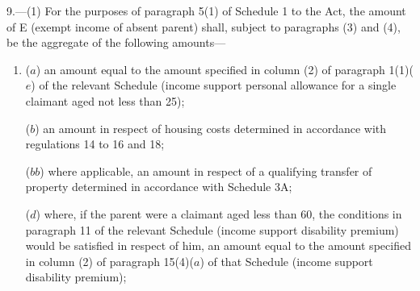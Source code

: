 \documentclass[12pt,a4paper]{article}
\begin{document}
9.—(1) For the purposes of paragraph 5(1) of Schedule 1 to the Act, the amount of E (exempt income of absent parent) shall, subject to paragraphs (3) and (4), be the aggregate of the following amounts—
\begin{enumerate}\item[]
($a$) an amount equal to the amount specified in column (2) of paragraph 1(1)($e$) of the relevant Schedule (income support personal allowance for a single claimant aged not less than 25);

($b$) an amount in respect of housing costs determined in accordance with regulations 14 to 
16 and 18;  %

($bb$) where applicable, an amount in respect of a qualifying transfer of property determined in accordance with Schedule 3A;


%
%
%

($d$) where, if the parent were a claimant aged less than 60, the conditions in paragraph 11 of the relevant Schedule (income support disability premium) would be satisfied in respect of him, an amount equal to the amount specified in column (2) of paragraph 15(4)($a$) of that Schedule (income support disability premium);


\end{enumerate}
\end{document}
